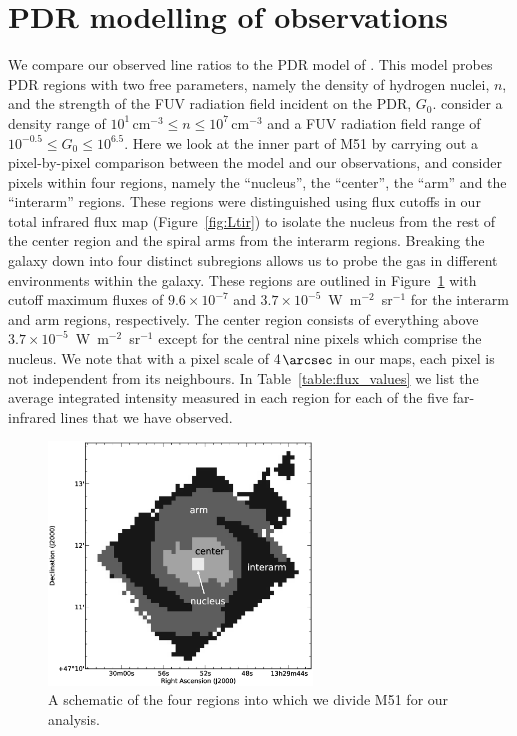 \documentclass[preprint2]{aastex}
\begin{document}
\section{PDR modelling of observations}\label{pdr_model}
We compare our observed line ratios to the PDR model of \citet{1999ApJ...527..795K,2006ApJ...644..283K}.  This model probes PDR regions with two free parameters, namely the density of hydrogen nuclei, $n$, and the strength of the FUV radiation field incident on the PDR, $G_{0}$.  \citet{1999ApJ...527..795K} consider a density range of $10^{1}\,\mathrm{cm}^{-3} \le n \le 10^{7}\,\mathrm{cm}^{-3}$ and a FUV radiation field range of $10^{-0.5} \le G_{0} \le 10^{6.5}$.  Here we look at the inner part of M51 by carrying out a pixel-by-pixel comparison between the model and our observations, and consider pixels within four regions, namely the ``nucleus'', the ``center'', the ``arm'' and the ``interarm'' regions.  These regions were distinguished using flux cutoffs in our total infrared flux map (Figure~\ref{fig:Ltir}) to isolate the nucleus from the rest of the center region and the spiral arms from the interarm regions.  Breaking the galaxy down into four distinct subregions allows us to probe the gas in different environments within the galaxy.  These regions are outlined in Figure~\ref{fig:regions} with cutoff maximum fluxes of $9.6 \times 10^{-7}$ and $3.7 \times 10^{-5}$~W~m$^{-2}$~sr$^{-1}$ for the interarm and arm regions, respectively.  The center region consists of everything above $3.7 \times 10^{-5}$~W~m$^{-2}$~sr$^{-1}$ except for the central nine pixels which comprise the nucleus.  We note that with a pixel scale of 4$\arcsec$ in our maps, each pixel is not independent from its neighbours.  In Table~\ref{table:flux_values} we list the average integrated intensity measured in each region for each of the five far-infrared lines that we have observed. 

\begin{figure}
\includegraphics[width=7.0cm]{Figure6}
\caption{A schematic of the four regions into which we divide M51 for our analysis.}
\label{fig:regions}
\end{figure}
\end{document}
